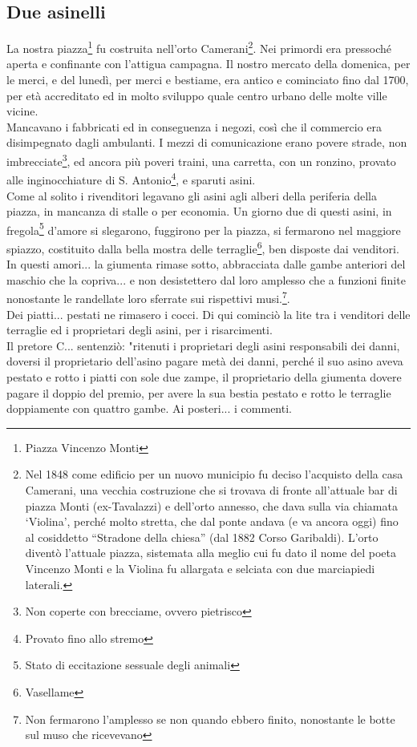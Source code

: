 \documentclass[10pt]{memoir} %
\begin{document}
\subsection{Due asinelli}
La nostra piazza\footnote{Piazza Vincenzo Monti} fu costruita nell'orto Camerani\footnote{Nel 1848 come edificio per un nuovo municipio fu deciso l'acquisto della casa Camerani, una vecchia costruzione che si trovava di fronte all'attuale bar di piazza Monti (ex-Tavalazzi) e dell'orto annesso, che dava sulla via chiamata ‘Violina’, perché molto stretta, che dal ponte andava (e va ancora oggi) fino al cosiddetto “Stradone della chiesa” (dal 1882 Corso Garibaldi). L'orto diventò l'attuale piazza, sistemata alla meglio cui fu dato il nome del poeta Vincenzo Monti e la Violina fu allargata e selciata con due marciapiedi laterali.}. Nei primordi era pressoché aperta e confinante con l'attigua campagna. Il nostro mercato della domenica, per le merci, e del lunedì, per merci e bestiame, era antico e cominciato fino dal 1700, per età accreditato ed in molto sviluppo quale centro urbano delle molte ville vicine. \\
Mancavano i fabbricati ed in conseguenza i negozi, così che il commercio era disimpegnato dagli ambulanti. I mezzi di comunicazione erano povere strade, non imbrecciate\footnote{Non coperte con brecciame, ovvero pietrisco}, ed ancora più poveri traini, una carretta, con un ronzino, provato alle inginocchiature di S. Antonio\footnote{Provato fino allo stremo}, e sparuti asini. \\
Come al solito i rivenditori legavano gli asini agli alberi della periferia della piazza, in mancanza di stalle o per economia. Un giorno due di questi asini, in fregola\footnote{Stato di eccitazione sessuale degli animali} d'amore si slegarono, fuggirono per la piazza, si fermarono nel maggiore spiazzo, costituito dalla bella mostra delle terraglie\footnote{Vasellame},  ben disposte dai venditori.\\
In questi amori... la giumenta rimase sotto, abbracciata dalle gambe anteriori del maschio che la copriva... e non desistettero dal loro amplesso che a funzioni finite nonostante le randellate loro sferrate sui rispettivi musi.\footnote{Non fermarono l'amplesso se non quando ebbero finito, nonostante le botte sul muso che ricevevano}.\\
Dei piatti... pestati ne rimasero i cocci. Di qui cominciò la lite tra i venditori delle terraglie ed i proprietari degli asini, per i risarcimenti. \\
Il pretore C\:.\:.\:. sentenziò: "ritenuti i proprietari degli asini responsabili dei danni, doversi il proprietario dell'asino pagare metà dei danni, perché il suo asino aveva pestato e rotto i piatti con sole due zampe, il proprietario della giumenta dovere pagare il doppio del premio, per avere la sua bestia pestato e rotto le terraglie doppiamente con quattro gambe. Ai posteri... i commenti.
\end{document}
